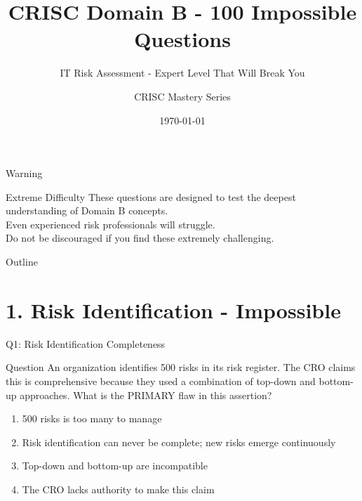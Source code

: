 \documentclass{beamer}
\title{CRISC Domain B - 100 Impossible Questions}
\subtitle{IT Risk Assessment - Expert Level That Will Break You}
\author{CRISC Mastery Series}
\date{\today}
\begin{document}
			
			\begin{frame}
				\titlepage
			\end{frame}
			
			\begin{frame}{Warning}
				\begin{alertblock}{Extreme Difficulty}
					These questions are designed to test the deepest understanding of Domain B concepts.\\
					Even experienced risk professionals will struggle.\\
					Do not be discouraged if you find these extremely challenging.
				\end{alertblock}
			\end{frame}
			
			\begin{frame}{Outline}
				\tableofcontents
			\end{frame}
			
			\section{1. Risk Identification - Impossible}
			\begin{frame}{Q1: Risk Identification Completeness}
				\begin{block}{Question}
					An organization identifies 500 risks in its risk register. The CRO claims this is comprehensive because they used a combination of top-down and bottom-up approaches. What is the PRIMARY flaw in this assertion?
				\end{block}
				\begin{enumerate}
					\item 500 risks is too many to manage
					\item Risk identification can never be complete; new risks emerge continuously
					\item Top-down and bottom-up are incompatible
					\item The CRO lacks authority to make this claim
				\end{enumerate}
			\end{frame}
			
\end{document}
